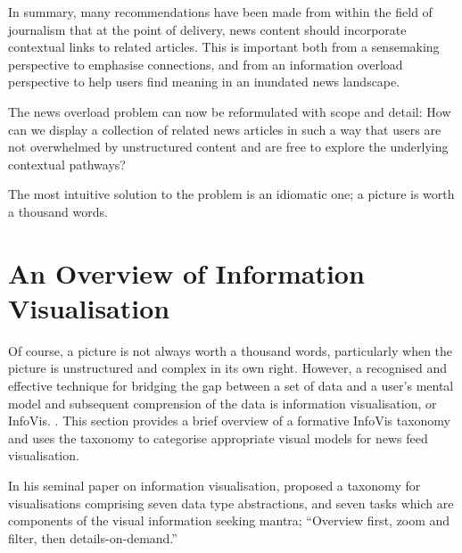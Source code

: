 In summary, many recommendations have been made from within the field of journalism that at the point of delivery, news content should incorporate contextual links to related articles. This is important both from a sensemaking perspective to emphasise connections, and from an information overload perspective to help users find meaning in an inundated news landscape.

The news overload problem can now be reformulated with scope and detail: How can we display a collection of related news articles in such a way that users are not overwhelmed by unstructured content and are free to explore the underlying contextual pathways?

The most intuitive solution to the problem is an idiomatic one; a picture is worth a thousand words.

\section{An Overview of Information Visualisation}

Of course, a picture is not always worth a thousand words, particularly when the picture is unstructured and complex in its own right. However, a recognised and effective technique for bridging the gap between a set of data and a user's mental model and subsequent comprension of the data is information visualisation, or InfoVis. \citep{UnderstandingAndCharacterizingInsights, ThemeRiver}. This section provides a brief overview of a formative InfoVis taxonomy and uses the taxonomy to categorise appropriate visual models for news feed visualisation.

In his seminal paper on information visualisation, \citeauthor{TheEyesHaveIt} proposed a taxonomy for visualisations comprising seven data type abstractions, and seven tasks which are components of the visual information seeking mantra; ``Overview first, zoom and filter, then details-on-demand.'' \citep[p.1]{TheEyesHaveIt}

